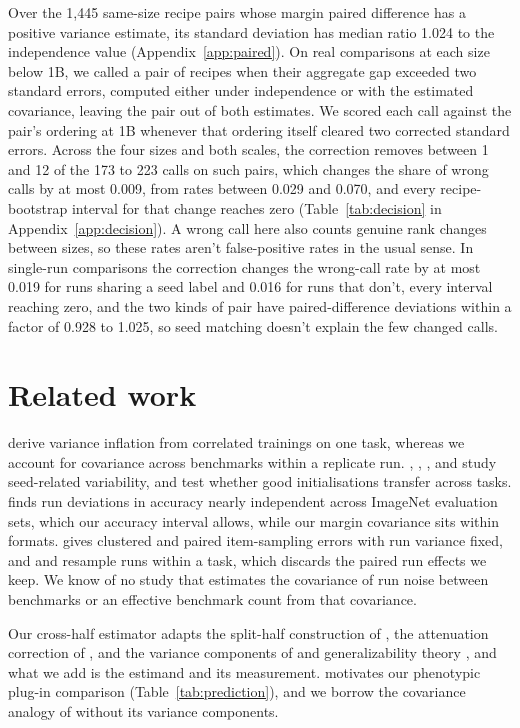 Over the 1,445 same-size recipe pairs whose margin paired difference has a positive variance estimate, its standard deviation has median ratio 1.024 to the independence value (Appendix~\ref{app:paired}). On real comparisons at each size below 1B, we called a pair of recipes when their aggregate gap exceeded two standard errors, computed either under independence or with the estimated covariance, leaving the pair out of both estimates. We scored each call against the pair's ordering at 1B whenever that ordering itself cleared two corrected standard errors. Across the four sizes and both scales, the correction removes between 1 and 12 of the 173 to 223 calls on such pairs, which changes the share of wrong calls by at most 0.009, from rates between 0.029 and 0.070, and every recipe-bootstrap interval for that change reaches zero (Table~\ref{tab:decision} in Appendix~\ref{app:decision}). A wrong call here also counts genuine rank changes between sizes, so these rates aren't false-positive rates in the usual sense. In single-run comparisons the correction changes the wrong-call rate by at most 0.019 for runs sharing a seed label and 0.016 for runs that don't, every interval reaching zero, and the two kinds of pair have paired-difference deviations within a factor of 0.928 to 1.025, so seed matching doesn't explain the few changed calls.


\section{Related work}
\citet{bouthillier2021} derive variance inflation from correlated trainings on one task, whereas we account for covariance across benchmarks within a replicate run. \citet{reimers2017}, \citet{zhou2020}, \citet{madaan2024}, and \citet{fehlauer2025} study seed-related variability, and \citet{dodge2020} test whether good initialisations transfer across tasks. \citet{jordan2024} finds run deviations in accuracy nearly independent across ImageNet evaluation sets, which our accuracy interval allows, while our margin covariance sits within formats. \citet{miller2024} gives clustered and paired item-sampling errors with run variance fixed, and \citet{henderson2018} and \citet{agarwal2021} resample runs within a task, which discards the paired run effects we keep. We know of no study that estimates the covariance of run noise between benchmarks or an effective benchmark count from that covariance.

Our cross-half estimator adapts the split-half construction of \citet{spearman1910,brown1910}, the attenuation correction of \citet{spearman1904}, and the variance components of \citet{searle1992} and generalizability theory \citep{brennan2001}, and what we add is the estimand and its measurement. \citet{cheverud1988} motivates our phenotypic plug-in comparison (Table~\ref{tab:prediction}), and we borrow the covariance analogy of \citet{martin1977} without its variance components.

